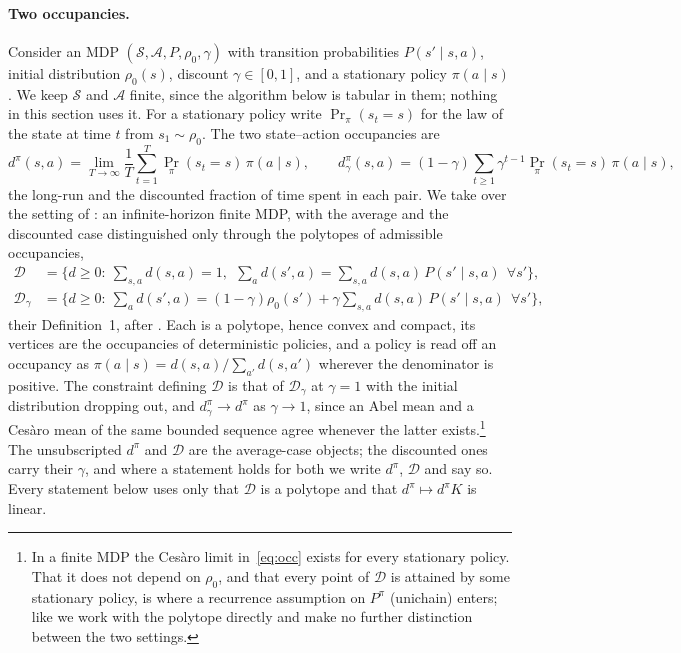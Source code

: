 \documentclass[11pt]{article}
\theoremstyle{remark}
\newcommand{\Acal}{\mathcal A}
\newcommand{\Scal}{\mathcal S}
\newcommand{\Dcal}{\mathcal D}
\newcommand{\1}{\mathds{1}}
\newcommand{\occ}{d^{\pi}}
\begin{document}
\paragraph{Two occupancies.}
Consider an MDP $(\Scal,\Acal,P,\rho_0,\gamma)$ with transition probabilities $P(s'\mid s,a)$, initial distribution $\rho_0(s)$, discount $\gamma\in[0,1]$, and a stationary policy $\pi(a\mid s)$.
We keep $\Scal$ and $\Acal$ finite, since the algorithm below is tabular in them; nothing in this section uses it.
For a stationary policy write $\Pr_\pi(s_t=s)$ for the law of the state at time $t$ from $s_1\sim\rho_0$.
The two state--action occupancies are
\begin{equation}
  \occ(s,a)=\lim_{T\to\infty}\frac1T\sum_{t=1}^{T}\Pr_\pi(s_t=s)\,\pi(a\mid s),
  \qquad
  \occ_\gamma(s,a)=(1-\gamma)\sum_{t\ge1}\gamma^{t-1}\Pr_\pi(s_t=s)\,\pi(a\mid s),
  \label{eq:occ}
\end{equation}
the long-run and the discounted fraction of time spent in each pair.
{\color{blue!70!black}
We take over the setting of \citet{Zahavy-reward21}: an infinite-horizon finite MDP, with the average and the discounted case distinguished only through the polytopes of admissible occupancies,
\begin{equation}
\begin{aligned}
  \Dcal&=\Big\{d\ge0:\ \textstyle\sum_{s,a}d(s,a)=1,\ \ \sum_a d(s',a)=\sum_{s,a}d(s,a)\,P(s'\mid s,a)\ \ \forall s'\Big\},\\
  \Dcal_\gamma&=\Big\{d\ge0:\ \textstyle\sum_a d(s',a)=(1-\gamma)\rho_0(s')+\gamma\sum_{s,a}d(s,a)\,P(s'\mid s,a)\ \ \forall s'\Big\},
\end{aligned}
\label{eq:polytope}
\end{equation}
their Definition~1, after \citet[Ch.~6 and~8]{Puterman-markov94}.
Each is a polytope, hence convex and compact, its vertices are the occupancies of deterministic policies, and a policy is read off an occupancy as $\pi(a\mid s)=d(s,a)/\sum_{a'}d(s,a')$ wherever the denominator is positive.
The constraint defining $\Dcal$ is that of $\Dcal_\gamma$ at $\gamma=1$ with the initial distribution dropping out, and $\occ_\gamma\to\occ$ as $\gamma\to1$, since an Abel mean and a Ces\`aro mean of the same bounded sequence agree whenever the latter exists.\footnote{In a finite MDP the Ces\`aro limit in~\eqref{eq:occ} exists for every stationary policy. That it does not depend on $\rho_0$, and that every point of $\Dcal$ is attained by some stationary policy, is where a recurrence assumption on $P^\pi$ (unichain) enters; like \citet{Zahavy-reward21} we work with the polytope directly and make no further distinction between the two settings.}
The unsubscripted $\occ$ and $\Dcal$ are the average-case objects; the discounted ones carry their $\gamma$, and where a statement holds for both we write $\occ$, $\Dcal$ and say so.
Every statement below uses only that $\Dcal$ is a polytope and that $\occ\mapsto\occ K$ is linear.
}
\end{document}
